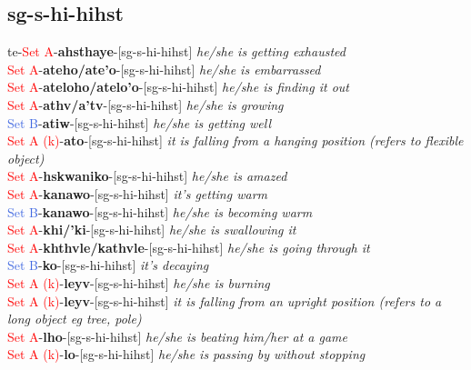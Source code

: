 \documentclass[oneside,openany]{book}%
\begin{document}
\subsection*{sg-s-hi-hihst}%
te{-}\textcolor{Red}{Set A}{-}\textbf{ahsthaye}{-}[sg-s-hi-hihst] \textit{ he/she is getting exhausted} \\%
\textcolor{Red}{Set A}{-}\textbf{ateho/ate'o}{-}[sg-s-hi-hihst] \textit{ he/she is embarrassed} \\%
\textcolor{Red}{Set A}{-}\textbf{ateloho/atelo'o}{-}[sg-s-hi-hihst] \textit{ he/she is finding it out} \\%
\textcolor{Red}{Set A}{-}\textbf{athv/a'tv}{-}[sg-s-hi-hihst] \textit{ he/she is growing} \\%
\textcolor{RoyalBlue}{Set B}{-}\textbf{atiw}{-}[sg-s-hi-hihst] \textit{ he/she is getting well} \\%
\textcolor{Red}{Set A (k)}{-}\textbf{ato}{-}[sg-s-hi-hihst] \textit{ it is falling from a hanging position (refers to flexible object)} \\%
\textcolor{Red}{Set A}{-}\textbf{hskwaniko}{-}[sg-s-hi-hihst] \textit{ he/she is amazed} \\%
\textcolor{Red}{Set A}{-}\textbf{kanawo}{-}[sg-s-hi-hihst] \textit{ it's getting warm} \\%
\textcolor{RoyalBlue}{Set B}{-}\textbf{kanawo}{-}[sg-s-hi-hihst] \textit{ he/she is becoming warm} \\%
\textcolor{Red}{Set A}{-}\textbf{khi/'ki}{-}[sg-s-hi-hihst] \textit{ he/she is swallowing it} \\%
\textcolor{Red}{Set A}{-}\textbf{khthvle/kathvle}{-}[sg-s-hi-hihst] \textit{ he/she is going through it} \\%
\textcolor{RoyalBlue}{Set B}{-}\textbf{ko}{-}[sg-s-hi-hihst] \textit{ it's decaying} \\%
\textcolor{Red}{Set A (k)}{-}\textbf{leyv}{-}[sg-s-hi-hihst] \textit{ he/she is burning} \\%
\textcolor{Red}{Set A (k)}{-}\textbf{leyv}{-}[sg-s-hi-hihst] \textit{ it is falling from an upright position (refers to a long object eg tree, pole)} \\%
\textcolor{Red}{Set A}{-}\textbf{lho}{-}[sg-s-hi-hihst] \textit{ he/she is beating him/her at a game} \\%
\textcolor{Red}{Set A (k)}{-}\textbf{lo}{-}[sg-s-hi-hihst] \textit{ he/she is passing by without stopping} \\%
\end{document}
